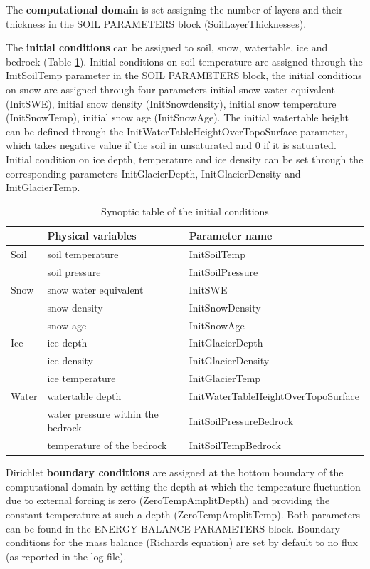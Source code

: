 The {\bf computational domain} is set assigning the number of layers and their thickness in the SOIL PARAMETERS block (SoilLayerThicknesses). 

The {\bf initial conditions} can be assigned to soil, snow, watertable, ice and bedrock (Table \ref{tab:IC}). Initial conditions on soil temperature are assigned through the InitSoilTemp parameter in the SOIL PARAMETERS block, the initial conditions on snow are assigned through four parameters initial snow water equivalent (InitSWE), initial snow density (InitSnowdensity), initial snow temperature (InitSnowTemp), initial snow age (InitSnowAge). The initial watertable height can be defined through the InitWaterTableHeightOverTopoSurface parameter, which takes negative value if the soil in unsaturated and 0 if it is saturated. Initial condition on ice depth, temperature and ice density can be set through the corresponding parameters InitGlacierDepth, InitGlacierDensity and InitGlacierTemp.

\begin{table}[h!]
\begin{center}
\begin{tabular}{|p{2.0cm}|p{5.5cm}|p{6.0cm}|}
\hline 
 &  \bfseries{Physical variables} & \bfseries{ Parameter name}\\
\hline 
Soil &  soil temperature & InitSoilTemp \\
& soil pressure& InitSoilPressure\\
\hline 
Snow &   snow water equivalent & InitSWE \\
& snow density & InitSnowDensity\\
& snow age & InitSnowAge\\
\hline Ice  &  ice depth & InitGlacierDepth \\
&ice density &InitGlacierDensity \\
&ice temperature & InitGlacierTemp\\
\hline Water & watertable depth & InitWaterTableHeightOverTopoSurface \\
&water pressure within the bedrock  &InitSoilPressureBedrock \\
& temperature of the bedrock & InitSoilTempBedrock \\
\hline
\end{tabular}
\caption{Synoptic table of the initial conditions}\label{tab:IC}
\end{center}
\end{table}

Dirichlet {\bf boundary conditions} are assigned at the bottom boundary of the computational domain by setting the depth at which the temperature fluctuation due to external forcing is zero (ZeroTempAmplitDepth) and providing the constant temperature at such a  depth (ZeroTempAmplitTemp). Both parameters can be found in the ENERGY BALANCE PARAMETERS block.
Boundary conditions for the mass balance (Richards equation) are set by default to no flux (as reported in the log-file).

